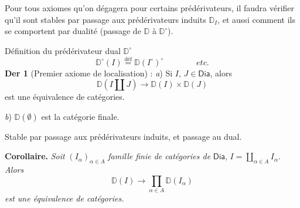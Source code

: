 \documentclass[11pt]{article}
\newcommand{\sDia}{\mathsf{Dia}}
\newcommand{\DD}{\mathbb{D}}
\begin{document}
Pour tous axiomes qu'on dégagera pour certains prédérivateurs, il faudra vérifier qu'il sont stables par passage aux prédérivateurs induits $\DD_I$, et aussi comment ils se comportent par dualité (passage de $\DD$ à $\DD^\circ$). %

Définition du prédérivateur dual $\DD^\circ$
\[ \DD^\circ(I) \overset{\text{déf}}{=} \DD(I^\circ)^\circ \qquad\qquad \textit{etc.} \]
\textbf{Der 1} (Premier axiome de localisation) : \textit{a}) Si $I$, $J \in \sDia$, alors
\[ \DD(I \amalg J) \longrightarrow \DD(I) \times \DD(J) \]
est une équivalence de catégories.

\textit{b}) $\DD(\emptyset)$ est la catégorie finale.

Stable par passage aux prédérivateurs induits, et passage au dual.

\textbf{Corollaire.} \textit{Soit} $(I_\alpha)_{\alpha \in A}$ \textit{famille finie de catégories de} $\sDia$, $I = \coprod\limits_{\alpha \in A} I_\alpha$. \textit{Alors}
\[ \DD(I) \longrightarrow \prod_{\alpha \in A} \DD(I_\alpha) \]
\textit{est une équivalence de catégories.}
\end{document}
